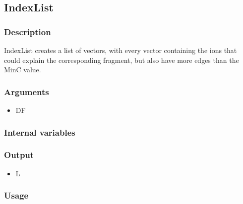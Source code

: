 \subsection{IndexList}\label{IndexList}
\subsubsection{Description}
IndexList creates a list of vectors, with every vector containing the ions that could explain the corresponding fragment, but also have more edges than the MinC value.
\subsubsection{Arguments}
\begin{itemize}
\item DF
\end{itemize}
\subsubsection{Internal variables}
\subsubsection{Output}
\begin{itemize}
\item L
\end{itemize}
\subsubsection{Usage}


